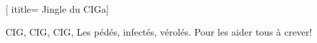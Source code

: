  [
ititle= {Jingle du CIGa}]

\beginverse
CIG, CIG, CIG,
Les pédés, infectés, vérolés.
Pour les aider
tous à crever!
\endverse

\endsong
